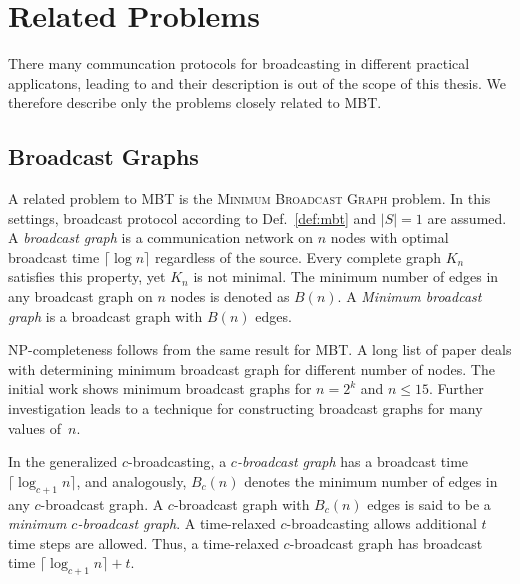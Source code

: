 

\section{Related Problems}

There many communcation protocols for broadcasting in different practical applicatons, leading to  and their description is out of the scope of this thesis.
We therefore describe only the problems closely related to MBT.

\subsection{Broadcast Graphs}

A related problem to MBT is the \textsc{Minimum Broadcast Graph} problem.
In this settings, broadcast protocol according to Def.~\ref{def:mbt} and  $|S|=1$ are assumed.
A \emph{broadcast graph} is a communication network on $n$ nodes with optimal broadcast time $\lceil \log n\rceil$ regardless of the source.
Every complete graph $K_n$ satisfies this property, yet $K_n$ is not minimal. 
The minimum number of edges in any broadcast graph on $n$ nodes is denoted as $B(n)$.
A \emph{Minimum broadcast graph} is a broadcast graph with $B(n)$ edges.

NP-completeness follows from the same result for MBT.
A long list of paper deals with determining minimum broadcast graph for different number of nodes.
The initial work \cite{farley79} shows minimum broadcast graphs for $n=2^k$ and $n\leq 15$.
Further investigation \cite{harutyunyan99} leads to a technique for constructing broadcast graphs for many values of~$n$.

In the generalized $c$-broadcasting, a \emph{$c$-broadcast graph} has a broadcast time $\lceil \log_{c+1} n\rceil$, and analogously, 
$B_c(n)$ denotes the minimum number of edges in any $c$-broadcast graph.
A $c$-broadcast graph with $B_c(n)$ edges is said to be a \emph{minimum $c$-broadcast graph}.
A time-relaxed $c$-broadcasting \cite{mcgarvey16} allows additional $t$ time steps are allowed.
Thus, a time-relaxed $c$-broadcast graph has broadcast time $\lceil \log_{c+1} n\rceil+t$.

